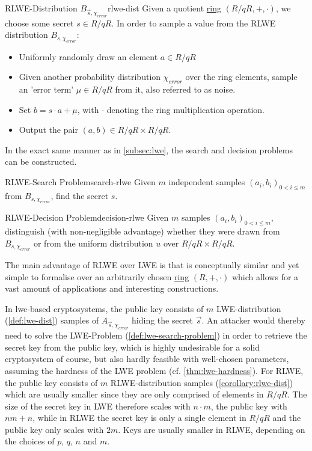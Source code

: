 \begin{corollary}{RLWE-Distribution $B_{\vec{s}, \chi_{error}}$}{rlwe-dist}
  Given a quotient \hyperref[def:ring]{ring} $(R/qR, +, \cdot)$, we choose some secret $s \in R/qR$.
  In order to sample a value from the RLWE distribution $B_{s, \chi_{error}}$:
  \begin{itemize}
    \item Uniformly randomly draw an element $a \in R/qR$
    \item Given another probability distribution $\chi_{error}$ over the ring elements,
          sample an 'error term' $\mu \in R/qR$ from it, also referred to as noise.
    \item Set $b = s \cdot a + \mu$, with $\cdot$ denoting the ring multiplication operation.
    \item Output the pair $(a, b) \in R/qR \times R/qR$.
  \end{itemize}
\end{corollary}

In the exact same manner as in \cref{subsec:lwe}, the search and decision problems can be constructed.

\begin{corollary}{RLWE-Search Problem}{search-rlwe}
  Given $m$ independent samples $(a_i, b_i)_{0 < i \leq m}$ from $B_{s, \chi_{error}}$, find the secret $s$.
\end{corollary}
\begin{corollary}{RLWE-Decision Problem}{decision-rlwe}
  Given $m$ samples $(a_i, b_i)_{0 < i \leq m}$, distinguish (with non-negligible advantage)
  whether they were drawn from $B_{s, \chi_{error}}$ or from the uniform distribution
  $u$ over $R/qR \times R/qR$.
\end{corollary}

The main advantage of RLWE over LWE is that is conceptually similar and yet simple to formalise over an arbitrarily chosen \hyperref[def:ring]{ring} $(R, +, \cdot)$ which allows for a vast amount of applications and interesting constructions.

In \gls{lwe}-based cryptosystems, the public key consists of $m$ LWE-distribution (\cref{def:lwe-dist}) samples of $A_{\vec{s},\chi_{error}}$ hiding the secret $\vec{s}$.
An attacker would thereby need to solve the LWE-Problem (\cref{def:lwe-search-problem}) in order to retrieve the secret key from the public key, which is highly undesirable for a solid cryptosystem of course, but also hardly feasible with well-chosen parameters, assuming the hardness of the LWE problem (cf. \cref{thm:lwe-hardness}).
For RLWE, the public key consists of $m$ RLWE-distribution samples (\cref{corollary:rlwe-dist}) which are usually smaller since they are only comprised of elements in $R/qR$.
The size of the secret key in LWE therefore scales with $n \cdot m$, the public key with $nm + n$, while in RLWE the secret key is only a single element in $R/qR$ and the public key only scales with $2m$.
Keys are usually smaller in RLWE, depending on the choices of $p$, $q$, $n$ and $m$.

